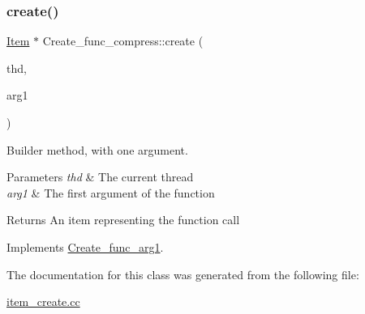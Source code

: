 \subsubsection{\texorpdfstring{create()}{create()}}
{\footnotesize\ttfamily \mbox{\hyperlink{classItem}{Item}} $\ast$ Create\+\_\+func\+\_\+compress\+::create (\begin{DoxyParamCaption}\item[{T\+HD $\ast$}]{thd,  }\item[{\mbox{\hyperlink{classItem}{Item}} $\ast$}]{arg1 }\end{DoxyParamCaption})\hspace{0.3cm}{\ttfamily [virtual]}}

Builder method, with one argument. 
\begin{DoxyParams}{Parameters}
{\em thd} & The current thread \\
\hline
{\em arg1} & The first argument of the function \\
\hline
\end{DoxyParams}
\begin{DoxyReturn}{Returns}
An item representing the function call 
\end{DoxyReturn}


Implements \mbox{\hyperlink{classCreate__func__arg1_a3e9a98f755cd82c3e762e334c955a8c9}{Create\+\_\+func\+\_\+arg1}}.



The documentation for this class was generated from the following file\+:\begin{DoxyCompactItemize}
\item 
\mbox{\hyperlink{item__create_8cc}{item\+\_\+create.\+cc}}\end{DoxyCompactItemize}
